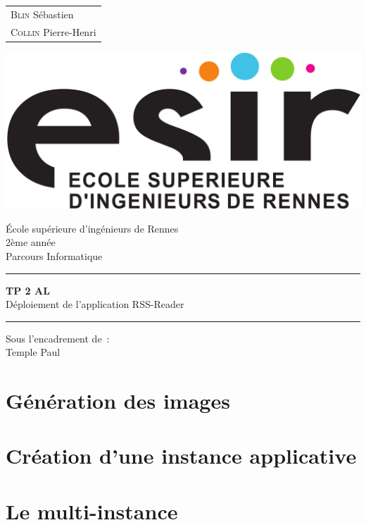 \documentclass{report}
\begin{document}
	\begin{titlepage}
		\vspace{-20px}
		\begin{tabular}{l}
			\textsc{Blin} Sébastien\\
			\textsc{Collin} Pierre-Henri
		\end{tabular}
		\hfill \vspace{10px}\includegraphics[scale=0.1]{esir}\\
		\vfill
		\begin{center}
			\Huge{\'Ecole sup\'erieure d'ing\'enieurs de Rennes}\\
			\vspace{1cm}
			\LARGE{2ème année}\\
			\large{Parcours Informatique}\\
			\vspace{0.5cm}\hrule\vspace{0.5cm}
			\LARGE{\textbf{TP 2 AL}}\\
			\Large{Déploiement de l'application RSS-Reader}
			\vspace{0.5cm}\hrule
			\vfill
			\vfill
		\end{center}
		\begin{flushleft}
			\Large{Sous l'encadrement de~:}\\
			\vspace{0.2cm}
			\large{{Temple} Paul}
		\end{flushleft}
		\vfill
	\end{titlepage}

	\section{Génération des images}
	\section{Création d'une instance applicative}
	\section{Le multi-instance}
\end{document}
